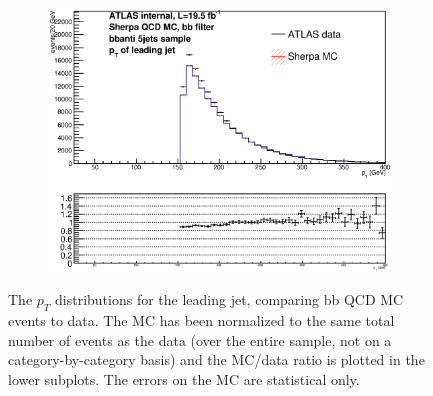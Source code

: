 \begin{figure}[phtb!]
\begin{center}
  \begin{subfigure}[$bbanti$ 5+ jet category]{0.3\textwidth}\includegraphics[width=\textwidth]{MonteCarlo/figures/pt0_bbanti_5jets.eps}\end{subfigure}
  \caption{The $p_T$ distributions for the leading jet, comparing bb QCD MC events to data.  The MC has been normalized
  to the same total number of events as the data (over the entire sample, not on a category-by-category basis)
  and the MC/data ratio is plotted in the lower subplots.  The errors on the MC are statistical only.
  \label{fig:bb_qcd_mc_pt0}}
    \end{center}
\end{figure}



